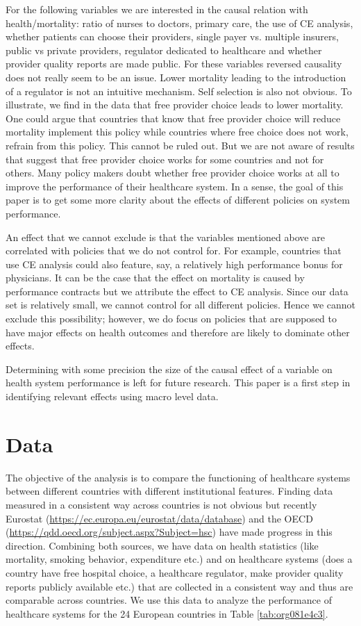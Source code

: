 \documentclass[12pt,english,a4paper]{article}
\begin{document}
For the following variables we are interested in the causal relation with health/mortality: ratio of nurses to doctors, primary care, the use of CE analysis, whether patients can choose their providers, single payer vs. multiple insurers, public vs private providers, regulator dedicated to healthcare and whether provider quality reports are made public. For these variables reversed causality does not really seem to be an issue. Lower mortality leading to the introduction of a regulator is not an intuitive mechanism. Self selection is also not obvious. To illustrate, we find in the data that free provider choice leads to lower mortality. One could argue that countries that know that free provider choice will reduce mortality implement this policy while countries where free choice does not work, refrain from this policy. This cannot be ruled out. But we are not aware of results that suggest that free provider choice works for some countries and not for others. Many policy makers doubt whether free provider choice works at all to improve the performance of their healthcare system. In a sense, the goal of this paper is to get some more clarity about the effects of different policies on system performance.

An effect that we cannot exclude is that the variables mentioned above are correlated with policies that we do not control for. For example, countries that use CE analysis could also feature, say, a relatively high performance bonus for physicians. It can be the case that the effect on mortality is caused by performance contracts but we attribute the effect to CE analysis. Since our data set is relatively small, we cannot control for all different policies. Hence we cannot exclude this possibility; however, we do focus on policies that are supposed to have major effects on health outcomes and therefore are likely to dominate other effects.

Determining with some precision the size of the causal effect of a variable on health system performance is left for future research. This paper is a first step in identifying relevant effects using macro level data.


\section{Data}
\label{sec:org98ba57f}

The objective of the analysis is to compare the functioning of healthcare systems between different countries with different institutional features. Finding data measured in a consistent way across countries is not obvious but recently Eurostat (\url{https://ec.europa.eu/eurostat/data/database}) and the OECD (\url{https://qdd.oecd.org/subject.aspx?Subject=hsc}) have made progress in this direction. Combining both sources, we have data on health statistics (like mortality, smoking behavior, expenditure etc.) and on healthcare systems (does a country have free hospital choice, a healthcare regulator, make provider quality reports publicly available etc.) that are collected in a consistent way and thus are comparable across countries. We use this data to analyze the performance of healthcare systems for the 24 European countries in Table \ref{tab:org081e4c3}.
\end{document}
